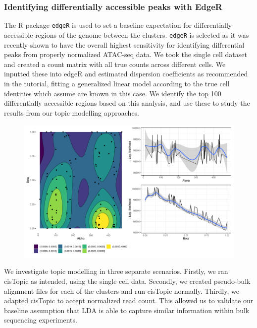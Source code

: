 \subsubsection{Identifying differentially accessible peaks with EdgeR} \label{ch4:edgeR}

The R package {\tt edgeR} is used to set a baseline expectation for differentially accessible regions of the genome between the clusters. {\tt edgeR} is selected as it was recently shown to have the overall highest sensitivity for identifying differential peaks from properly normalized ATAC-seq data. We took the single cell dataset and created a count matrix with all true counts across different cells. We inputted these into edgeR and estimated dispersion coefficients as recommended in the tutorial, fitting a generalized linear model according to the true cell identities which assume are known in this case. We identify the top 100 differentially accessible regions based on this analysis, and use these to study the results from our topic modelling approaches.

\begin{figure}
  \centering
  \includegraphics[width=\textwidth]{plot/ch4/sim_ll_surface.pdf}
  \label{fig:llhood_surfacea_simulation}
\end{figure}

We investigate topic modelling in three separate scenarios. Firstly, we ran cisTopic as intended, using the single cell data. Secondly, we created pseudo-bulk alignment files for each of the clusters and run cisTopic normally. Thirdly, we adapted cisTopic to accept normalized read count. This allowed us to validate our baseline assumption that LDA is able to capture similar information within bulk sequencing experiments.

